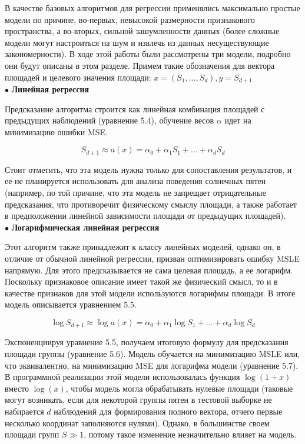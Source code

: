 \documentclass[a4paper, 12pt]{article}
\begin{document}
В качестве базовых алгоритмов для регрессии применялись максимально простые модели по причине, во-первых, невысокой размерности признакового пространства, а во-вторых, сильной зашумленности данных (более сложные модели могут настроиться на шум и извлечь из данных несуществующие закономерности). В ходе этой работы были рассмотрены три модели, подробно они будут описаны в этом разделе. Примем такие обозначения для вектора площадей и целевого значения площади: $x = (S_1, ..., S_d), y = S_{d+1}$ \\

$\bullet$ \textbf{Линейная регрессия}

Предсказание алгоритма строится как линейная комбинация площадей с предыдущих наблюдений (уравнение 5.4), обучение весов $\alpha$ идет на минимизацию ошибки MSE.

\begin{equation}
    S_{d+1} \approx a(x) = \alpha_0 + \alpha_1 S_1 + ... + \alpha_d S_d
\end{equation}{}

Стоит отметить, что эта модель нужна только для сопоставления результатов, и ее не планируется использовать для анализа поведения солнечных пятен (например, по той причине, что эта модель не запрещает отрицательные предсказания, что противоречит физическому смыслу площади, а также работает в предположении линейной зависимости площади от предыдущих площадей). \\

$\bullet$ \textbf{Логарифмическая линейная регрессия}

Этот алгоритм также принадлежит к классу линейных моделей, однако он, в отличие от обычной линейной регрессии, призван оптимизировать ошибку MSLE напрямую. Для этого предсказывается не сама целевая площадь, а ее логарифм. Поскольку признаковое описание имеет такой же физический смысл, то и в качестве признаков для этой модели используются логарифмы площади. В итоге модель описывается уравнением 5.5.

\begin{equation}
    \log S_{d + 1} \approx \log a(x) = \alpha_0 + \alpha_1 \log S_1 + ... + \alpha_d \log S_d
\end{equation}

Экспоненциируя уравнение 5.5, получаем итоговую формулу для предсказания площади группы (уравнение 5.6). Модель обучается на минимизацию MSLE или, что эквивалентно, на минимизацию MSE для логарифма модели (уравнение 5.7). В программной реализации этой модели использовалась функция $\log(1 + x)$ вместо $\log(x)$, чтобы модель могла обрабатывать нулевые площади (таковые могут возникать, если для некоторой группы пятен в тестовой выборке не набирается $d$ наблюдений для формирования полного вектора, отчего первые несколько координат заполняются нулями). Однако, в большинстве своем площади групп $S \gg 1$, потому такое изменение незначительно влияет на модель.
\end{document}
